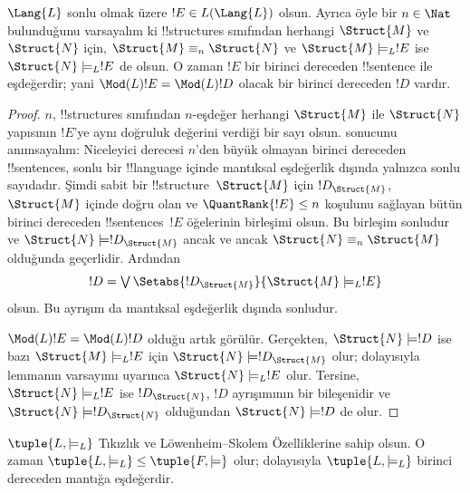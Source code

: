 \documentclass[../../../include/open-logic-section]{subfiles}
\begin{document}


\begin{lem}
$\Lang{L}$ sonlu olmak üzere $!E\in L(\Lang{L})$ olsun. Ayrıca öyle bir
$n\in\Nat$ bulunduğunu varsayalım ki !!{structure}s sınıfından herhangi
$\Struct{M}$ ve $\Struct{N}$ için, $\Struct{M}\equiv_n\Struct{N}$ ve
$\Struct{M}\models_L !E$ ise $\Struct{N}\models_L !E$ de olsun. O zaman
$!E$ bir birinci dereceden !!{sentence} ile eşdeğerdir; yani
$\Mod(L){!E}=\Mod(L){!D}$ olacak bir birinci dereceden $!D$ vardır.
\end{lem}

\begin{proof}
$n$, !!{structure}s sınıfından $n$-eşdeğer herhangi $\Struct{M}$ ile
$\Struct{N}$ yapısının $!E$'ye aynı doğruluk değerini verdiği bir sayı olsun.
 sonucunu anımsayalım: Niceleyici derecesi
$n$'den büyük olmayan birinci dereceden !!{sentence}s, sonlu bir
!!{language} içinde mantıksal eşdeğerlik dışında yalnızca sonlu
sayıdadır. Şimdi sabit bir !!{structure}~$\Struct{M}$ için
$!D_{\Struct{M}}$, $\Struct{M}$ içinde doğru olan ve
$\QuantRank{!E}\leq n$ koşulunu sağlayan bütün birinci dereceden
!!{sentence}s~$!E$ öğelerinin birleşimi olsun. Bu birleşim sonludur ve
$\Struct{N}\models !D_{\Struct{M}}$ ancak ve ancak
$\Struct{N}\equiv_n\Struct{M}$ olduğunda geçerlidir. Ardından
\[
  !D=\textstyle\bigvee
  \Setabs{!D_{\Struct{M}}}{\Struct{M}\models_L !E}
\]
olsun. Bu ayrışım da mantıksal eşdeğerlik dışında sonludur.

$\Mod(L){!E}=\Mod(L){!D}$ olduğu artık görülür. Gerçekten,
$\Struct{N}\models !D$ ise bazı $\Struct{M}\models_L !E$ için
$\Struct{N}\models !D_{\Struct{M}}$ olur; dolayısıyla lemmanın varsayımı
uyarınca $\Struct{N}\models_L !E$ olur. Tersine,
$\Struct{N}\models_L !E$ ise $!D_{\Struct{N}}$, $!D$ ayrışımının bir
bileşenidir ve $\Struct{N}\models !D_{\Struct{N}}$ olduğundan
$\Struct{N}\models !D$ de olur.
\end{proof}

\begin{thm}
  $\tuple{L,\models_L}$ Tıkızlık ve L\"owenheim--Skolem Özelliklerine
  sahip olsun. O zaman
  $\tuple{L,\models_L}\leq\tuple{F,\models}$ olur; dolayısıyla
  $\tuple{L,\models_L}$ birinci dereceden mantığa eşdeğerdir.
\end{thm}
\end{document}

